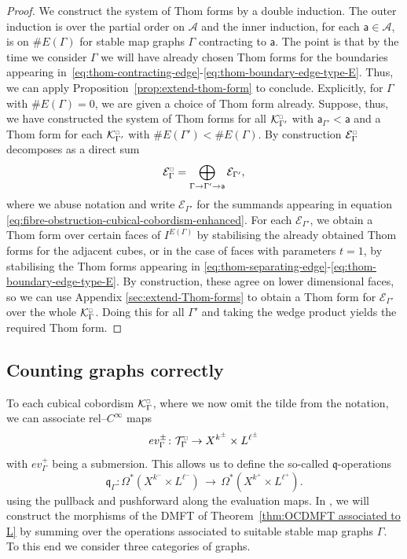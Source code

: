 \documentclass[11pt,psamsfonts, oneside, reqno]{amsart}
\newcommand{\cl}{\colon}
\newcommand{\eva}{ev}
\newcommand{\cA}{\mathcal{A}}
\newcommand{\cE}{\mathcal{E}}
\newcommand{\cK}{\mathcal{K}}
\newcommand{\cT}{\mathcal{T}}
\newcommand{\fq}{\mathfrak{q}}
\newcommand{\mfa}{\mathsf{a}}
\newcommand{\cKc}{\cK^{\scale{\square}{0.6}}}
\newcommand{\scale}[2]{\scaleobj{#2}{#1}}
\newcommand{\cEc}{\cE^{\scale{\square}{0.6}}}
\newcommand{\cTc}{\cT^{\scale{\square}{0.6}}}
\theoremstyle{definition}
\theoremstyle{remark}
\numberwithin{equation}{section}
\begin{document}
\begin{proof} 
	We construct the system of Thom forms by a double induction. The outer induction is over the partial order on $\cA$ and the inner induction, for each $\mfa \in \cA$, is on $\# E(\Gamma)$ for stable map graphs $\Gamma$ contracting to $\mfa$. The point is that by the time we consider $\Gamma$ we will have already chosen Thom forms for the boundaries appearing in~\eqref{eq:thom-contracting-edge}-\eqref{eq:thom-boundary-edge-type-E}. Thus, we can apply Proposition~\ref{prop:extend-thom-form} to conclude.  
	Explicitly, for $\Gamma$ with $\# E(\Gamma) = 0$, we are given a choice of Thom form already. Suppose, thus, we have constructed the system of Thom forms for all $\cKc_{\Gamma'}$ with $\mfa_{\Gamma'} < \mfa$ and a Thom form for each $\cKc_{\Gamma'}$ with $\#E(\Gamma') < \# E(\Gamma)$. By construction $\cEc_{\Gamma}$ decomposes as a direct sum 
	\[
	\cEc_\Gamma = \bigoplus_{\Gamma \to \Gamma' \to \mfa} \cE_{\Gamma'},
	\]
	where we abuse notation and write $\cE_{\Gamma'}$ for the summands appearing in equation \eqref{eq:fibre-obstruction-cubical-cobordism-enhanced}. For each $\cE_{\Gamma'}$, we obtain a Thom form over certain faces of $I^{E(\Gamma)}$ by stabilising the already obtained Thom forms for the adjacent cubes, or in the case of faces with parameters $t=1$, by stabilising the Thom forms appearing in \eqref{eq:thom-separating-edge}-\eqref{eq:thom-boundary-edge-type-E}. By construction, these agree on lower dimensional faces, so we can use Appendix \ref{sec:extend-Thom-forms} to obtain a Thom form for $\cE_{\Gamma'}$ over the whole $\cKc_\Gamma$. Doing this for all $\Gamma'$ and taking the wedge product yields the required Thom form.
\end{proof}
\subsection{Counting graphs correctly}\label{subsec:graphs} 
To each cubical cobordism $\cKc_\Gamma$, where we now omit the tilde from the notation, we can associate rel--$C^\infty$ maps 
$$\eva^\pm_\Gamma\cl \cTc_\Gamma\to X^{k^\pm}\times L^{\ell^\pm}$$
with $\eva^+_\Gamma$ being a submersion. This allows us to define the so-called $\fq$-operations 
\begin{equation*}
	\fq_\Gamma\cl \Omega^*(X^{k^-}\times L^{\ell^-})\,\to\, \Omega^*(X^{k^+}\times L^{\ell^+}).
\end{equation*}
using the pullback and pushforward along the evaluation maps. In \cite{HH1}, we will construct the morphisms of the DMFT of Theorem~\ref{thm:OCDMFT associated to L} by summing over the operations associated to suitable stable map graphs $\Gamma$. To this end we consider three categories of graphs. 
\end{document}
